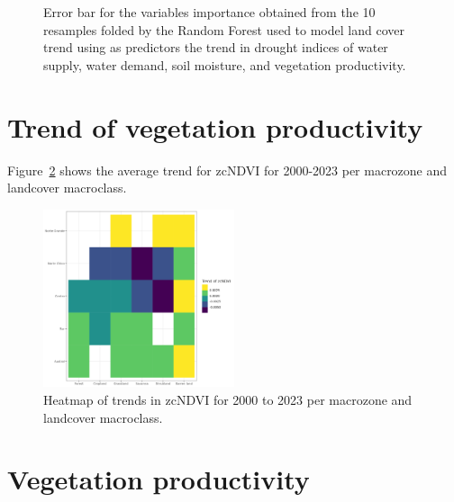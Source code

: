 \documentclass[
  authoryear,
  preprint,
  3p,
  onecolumn]{elsarticle}
\begin{document}
\begin{figure}
\begin{minipage}[t]{0.33\linewidth}
{{}

}

\end{minipage}%

\caption{\label{fig-RF_importance}Error bar for the variables importance
obtained from the 10 resamples folded by the Random Forest used to model
land cover trend using as predictors the trend in drought indices of
water supply, water demand, soil moisture, and vegetation productivity.}

\end{figure}

\hypertarget{trend-of-vegetation-productivity}{%
\section{Trend of vegetation
productivity}\label{trend-of-vegetation-productivity}}

Figure~\ref{fig-hetmaptrendzcNDVI} shows the average trend for zcNDVI
for 2000-2023 per macrozone and landcover macroclass.

\begin{figure}[!ht]

{\centering \includegraphics[width=0.5\textwidth,height=\textheight]{../output/figs/heatmap_trends_zcNDVI_macro_landcover.png}

}

\caption{\label{fig-hetmaptrendzcNDVI}Heatmap of trends in zcNDVI for
2000 to 2023 per macrozone and landcover macroclass.}

\end{figure}

\hypertarget{vegetation-productivity}{%
\section{Vegetation productivity}\label{vegetation-productivity}}
\end{document}
